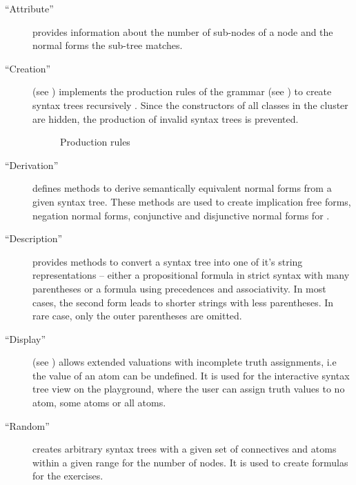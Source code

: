\begin{description}

\item[“Attribute”] provides information about the number of sub-nodes of a node 
and the normal forms the sub-tree matches. 

\item[“Creation”] (see ) 
implements the production rules of the grammar (see )
to create syntax trees recursively .
Since the constructors of all classes in the cluster are hidden, 
the production of invalid syntax trees is prevented.

\begin{figure}[htbp]
\begin{center}
\caption{Production rules}
\label{fig:NyayaNodeCreation}
\end{center}
\end{figure}

\item[“Derivation”] defines methods to derive semantically equivalent normal forms from a given syntax tree.
These methods are used to create implication free forms, negation normal forms, conjunctive and disjunctive normal forms for \BoolTool.

\item[“Description”] provides methods to convert a syntax tree into one of it's string representations – 
either a propositional formula in strict syntax with many parentheses 
or a formula using precedences and associativity.
In most cases, the second form leads to shorter strings with less parentheses. 
In rare case, only the outer parentheses are omitted.

\item[“Display”]\label{item:DISPLAY} (see ) allows extended valuations
with incomplete truth assignments, i.e the value of an atom can be undefined.
It is used for the interactive syntax tree view on the playground, 
where the user can assign truth values to no atom, some atoms or all atoms.
% 


\item[“Random”] creates arbitrary syntax trees with a given set of connectives and atoms 
within a given range for the number of nodes. It is used to create formulas for the exercises.


\end{description}
